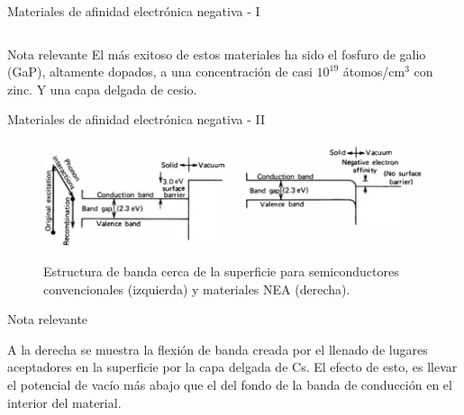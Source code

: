 \documentclass[a4paper,10pt]{beamer}
\begin{document}
\begin{frame}{Materiales de afinidad electrónica negativa - I}
\begin{columns}[c]
\end{columns}
 
  \begin{block}{Nota relevante}
  El más exitoso de estos materiales ha sido el fosfuro de galio (GaP), altamente 
  dopados, a una concentración de casi $10^{19}$ átomos/cm$^3$ con zinc. Y una capa
  delgada de cesio.
 \end{block}

\end{frame}

\begin{frame}{Materiales de afinidad electrónica negativa - II}

\begin{figure}
 \includegraphics[scale=0.33]{fig10}
 \caption{Estructura de banda cerca de la superficie para semiconductores 
 convencionales (izquierda) y materiales NEA (derecha).}
\end{figure}

\begin{block}{Nota relevante}
\begin{justify}
 A la derecha se muestra la flexión de banda creada por el llenado de lugares 
 aceptadores en la superficie por la capa delgada de Cs. El efecto de esto, 
 es llevar el potencial de vacío más abajo que el del fondo de la banda de 
 conducción en el interior del material.
 \end{justify}
\end{block}

\end{frame}
\end{document}
